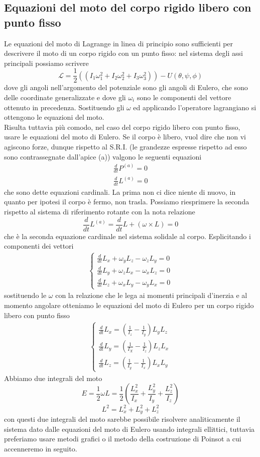 \documentclass[
10pt, %
a4paper, %
oneside, %
headinclude,footinclude, %
BCOR5mm, %
]{scrartcl}
\begin{document}
\begin{esercizio}
\end{esercizio}
\subsection{Equazioni del moto del corpo rigido libero con punto fisso}
Le equazioni del moto di Lagrange in linea di principio sono sufficienti per descrivere il moto di un corpo rigido con un punto fisso: nel sistema degli assi principali possiamo scrivere 
\[\mathcal{L} = \frac{1}{2}((I_1\omega_1^2+I_2\omega_2^2+I_3\omega_3^2))-U(\theta, \psi, \phi)\]
dove gli angoli nell'argomento del potenziale sono gli angoli di Eulero, che sono delle coordinate generalizzate e dove gli \(\omega_i\) sono le componenti del vettore ottenuto in precedenza. Sostituendo gli $\omega$ ed applicando l'operatore lagrangiano si ottengono le equazioni del moto.\\
Risulta tuttavia più comodo, nel caso del corpo rigido libero con punto fisso, usare le equazioni del moto di Eulero. Se il corpo è libero, vuol dire che non vi agiscono forze, dunque rispetto al S.R.I. (le grandezze espresse rispetto ad esso sono contrassegnate dall'apice (a)) valgono le seguenti equazioni
\begin{align*}
	\frac{d}{dt}P^{(a)} = 0\\
	\frac{d}{dt}L^{(a)} = 0
\end{align*}
che sono dette equazioni cardinali. La prima non ci dice niente di nuovo, in quanto per ipotesi il corpo è fermo, non trasla. Possiamo riesprimere la seconda rispetto al sistema di riferimento rotante con la nota relazione 
\[\frac{d}{dt}L^{(a)} = \frac{d}{dt}L + (\omega\times L) = 0\]
che è la seconda equazione cardinale nel sistema solidale al corpo. Esplicitando i componenti dei vettori 
\begin{align*}
	\begin{cases}
		\frac{d}{dt}L_x + \omega_yL_z-\omega_zL_y = 0\\
		\frac{d}{dt}L_y +  \omega_zL_x-\omega_xL_z= 0\\
		\frac{d}{dt}L_z + \omega_xL_y-\omega_yL_x = 0
	\end{cases}
\end{align*}
sostituendo le $\omega$ con la relazione che le lega ai momenti principali d'inerzia e al momento angolare otteniamo le equazioni del moto di Eulero per un corpo rigido libero con punto fisso
\begin{align*}
	\begin{cases}
		\frac{d}{dt}L_x =\left(\frac{1}{I_z}-\frac{1}{I_y}\right)L_yL_z\\
		\frac{d}{dt}L_y =\left(\frac{1}{I_X}-\frac{1}{I_z}\right)L_zL_x\\
		\frac{d}{dt}L_z =\left(\frac{1}{I_y}-\frac{1}{I_x}\right)L_xL_y
	\end{cases}
\end{align*}
Abbiamo due integrali del moto
\[E = \frac{1}{2}\omega L = \frac{1}{2}\left(\frac{L^2_x}{I_x}+\frac{L^2_y}{I_y}+\frac{L^2_z}{I_z}\right)\]
\[L^2 = L_x^2+L_y^2+L_z^2\]
con questi due integrali del moto sarebbe possibile risolvere analiticamente il sistema dato dalle equazioni del moto di Eulero usando integrali ellittici, tuttavia preferiamo usare metodi grafici o il metodo della costruzione di Poinsot a cui accenneremo in seguito.
\end{document}
